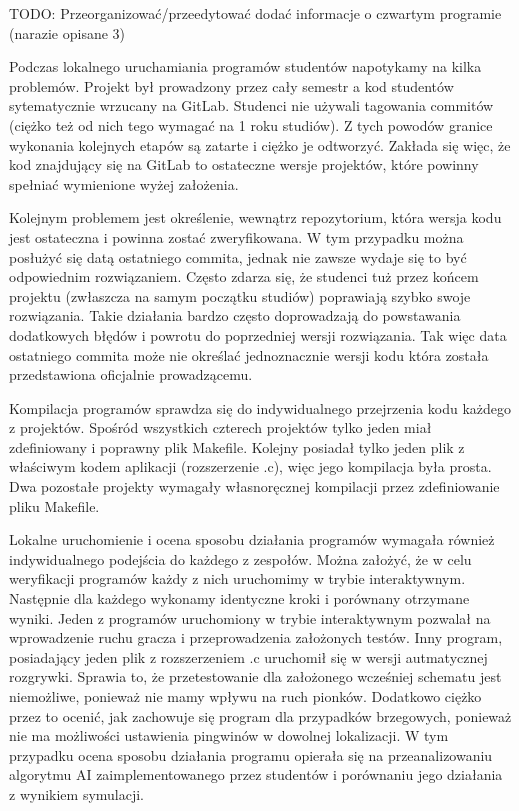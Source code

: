 TODO: Przeorganizować/przeedytować dodać informacje o czwartym programie (narazie opisane 3)

Podczas lokalnego uruchamiania programów studentów napotykamy na kilka problemów.
Projekt był prowadzony przez cały semestr a kod studentów sytematycznie wrzucany na GitLab.
Studenci nie używali tagowania commitów (ciężko też od nich tego wymagać na 1 roku studiów).
Z tych powodów granice wykonania kolejnych etapów są zatarte i ciężko je odtworzyć.
Zakłada się więc, że kod znajdujący się na GitLab to ostateczne wersje projektów, które powinny spełniać wymienione wyżej założenia.

Kolejnym problemem jest określenie, wewnątrz repozytorium, która wersja kodu jest ostateczna i powinna zostać zweryfikowana.
W tym przypadku można posłużyć się datą ostatniego commita, jednak nie zawsze wydaje się to być odpowiednim rozwiązaniem.
Często zdarza się, że studenci tuż przez końcem projektu (zwłaszcza na samym początku studiów) poprawiają szybko swoje rozwiązania.
Takie działania bardzo często doprowadzają do powstawania dodatkowych błędów i powrotu do poprzedniej wersji rozwiązania.
Tak więc data ostatniego commita może nie określać jednoznacznie wersji kodu która została przedstawiona oficjalnie prowadzącemu.

Kompilacja programów sprawdza się do indywidualnego przejrzenia kodu każdego z projektów.
Spośród wszystkich czterech projektów tylko jeden miał zdefiniowany i poprawny plik Makefile.
Kolejny posiadał tylko jeden plik z właściwym kodem aplikacji (rozszerzenie .c), więc jego kompilacja była prosta.
Dwa pozostałe projekty wymagały własnoręcznej kompilacji przez zdefiniowanie pliku Makefile.

Lokalne uruchomienie i ocena sposobu działania programów wymagała również indywidualnego podejścia do każdego z zespołów.
Można założyć, że w celu weryfikacji programów każdy z nich uruchomimy w trybie interaktywnym.
Następnie dla każdego wykonamy identyczne kroki i porównany otrzymane wyniki.
Jeden z programów uruchomiony w trybie interaktywnym pozwalał na wprowadzenie ruchu gracza i przeprowadzenia założonych testów.
Inny program, posiadający jeden plik z rozszerzeniem .c uruchomił się w wersji autmatycznej rozgrywki.
Sprawia to, że przetestowanie dla założonego wcześniej schematu jest niemożliwe, ponieważ nie mamy wpływu na ruch pionków.
Dodatkowo ciężko przez to ocenić, jak zachowuje się program dla przypadków brzegowych, ponieważ nie ma możliwości ustawienia pingwinów w dowolnej lokalizacji.
W tym przypadku ocena sposobu działania programu opierała się na przeanalizowaniu algorytmu AI zaimplementowanego przez studentów i porównaniu jego działania z wynikiem symulacji.


